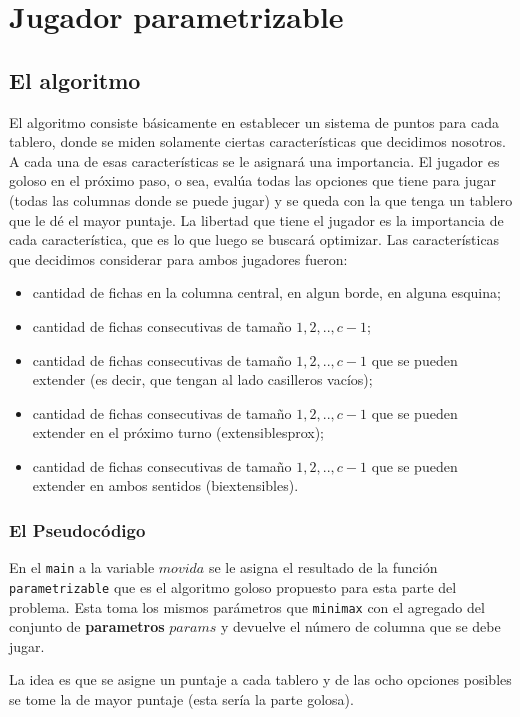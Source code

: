 \documentclass[A4paper,oneside,fleqn,11pt]{article}
\theoremstyle{definition}
\begin{document}
\section{Jugador parametrizable}


\subsection{El algoritmo}
El algoritmo consiste básicamente en establecer un sistema de puntos para cada tablero, donde se miden solamente ciertas características que decidimos nosotros. A cada una de esas características se le asignará una importancia. El jugador es goloso en el próximo paso, o sea, evalúa todas las opciones que tiene para jugar (todas las columnas donde se puede jugar) y se queda con la que tenga un tablero que le dé el mayor puntaje. La libertad que tiene el jugador es la importancia de cada característica, que es lo que luego se buscará optimizar. Las características que decidimos considerar para ambos jugadores fueron:

\begin{itemize}
\item cantidad de fichas en la columna central, en algun borde, en alguna esquina;
\item cantidad de fichas consecutivas de tamaño $1,2,..,c-1$;
\item cantidad de fichas consecutivas de tamaño $1,2,..,c-1$ que se pueden extender (es decir, que tengan al lado casilleros vacíos); 
\item cantidad de fichas consecutivas de tamaño $1,2,..,c-1$ que se pueden extender en el próximo turno (extensiblesprox);
\item cantidad de fichas consecutivas de tamaño $1,2,..,c-1$ que se pueden extender en ambos sentidos (biextensibles).
\end{itemize}
\subsubsection{El Pseudocódigo}
En el \texttt{main} a la variable $movida$ se le asigna el resultado de la función \texttt{parametrizable} que es el algoritmo goloso propuesto para esta parte del problema. Esta toma los mismos parámetros que \texttt{minimax} con el agregado del conjunto de \textbf{parametros} $params$ y devuelve el número de columna que se debe jugar.

La idea es que se asigne un puntaje a cada tablero y de las ocho opciones posibles se tome la de mayor puntaje (esta sería la parte golosa).
\end{document}
